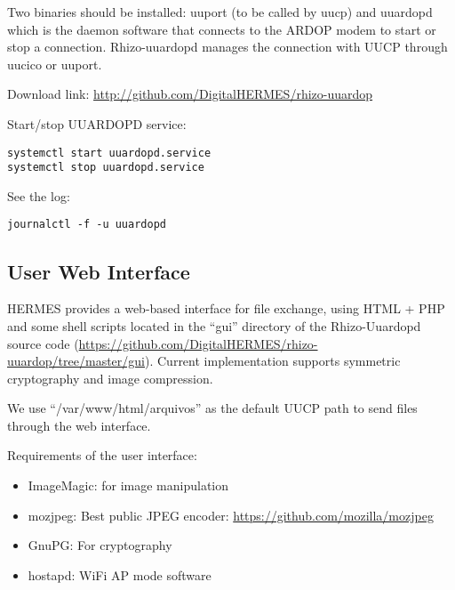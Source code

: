\documentclass[11pt,a4paper]{article}
\begin{document}
Two binaries should be installed: uuport (to be called by uucp) and uuardopd
which is the daemon software that connects to the ARDOP modem to start
or stop a connection. Rhizo-uuardopd manages the connection with UUCP
through uucico or uuport.

Download link: \url{http://github.com/DigitalHERMES/rhizo-uuardop}

Start/stop UUARDOPD service:
\begin{verbatim}
systemctl start uuardopd.service
systemctl stop uuardopd.service
\end{verbatim}


See the log:
\begin{verbatim}
journalctl -f -u uuardopd
\end{verbatim}





\subsection{User Web Interface}

HERMES provides a web-based interface for file exchange, using HTML + PHP and
some shell scripts located in the ``gui'' directory of the Rhizo-Uuardopd source
code
(\url{https://github.com/DigitalHERMES/rhizo-uuardop/tree/master/gui}). Current
implementation supports symmetric cryptography and image compression.

We use ``/var/www/html/arquivos'' as the default UUCP path to send
files through the web interface.

Requirements of the user interface:

\begin{itemize}
\item ImageMagic: for image manipulation
\item mozjpeg: Best public JPEG encoder: \url{https://github.com/mozilla/mozjpeg}
\item GnuPG: For cryptography
\item hostapd: WiFi AP mode software
\end{itemize}
\end{document}
